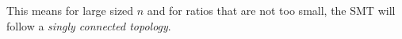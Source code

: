     
This means for large sized $n$ and for ratios that are not too small, the SMT will follow a \textit{singly connected topology}. 


    

    


    

